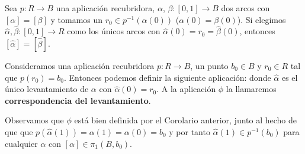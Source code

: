 \begin{coro}
    Sea $p:R\to B$ una aplicación recubridora, $\alpha$, $\beta:[0,1]\to B$ dos arcos con $[\alpha]=[\beta]$ y tomamos un $r_0\in p^{-1}(\alpha(0))$ ($\alpha(0)=\beta(0)$). Si elegimos $\hat{\alpha}, \hat{\beta}:[0,1]\to R$ como los únicos arcos con $\hat{\alpha}(0)=r_0=\hat{\beta}(0)$, entonces $[\hat{\alpha}] = [\hat{\beta}]$.
\end{coro}

\begin{definicion}%
    Consideramos una aplicación recubridora $p:R\to B$, un punto $b_0\in B$ y $r_0\in R$ tal que $p(r_0)=b_0$. Entonces podemos definir la siguiente aplicación:
    donde $\hat{\alpha}$ es el único levantamiento de $\alpha$ con $\hat{\alpha}(0)=r_0$.
    A la aplicación $\phi$ la llamaremos \textbf{correspondencia del levantamiento}.
\end{definicion}

Observamos que $\phi$ está bien definida por el Corolario anterior, junto al hecho de que que $p(\hat{\alpha}(1))=\alpha(1)=\alpha(0)=b_0$ y por tanto $\hat{\alpha}(1)\in p^{-1}(b_0)$ para cualquier $\alpha$ con $[\alpha] \in \pi_1(B,b_0)$.


